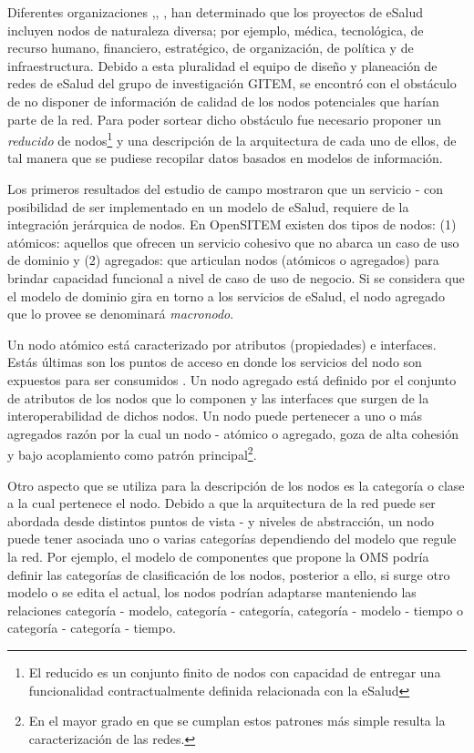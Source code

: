 Diferentes organizaciones \cite{ops2011},\cite{oms2016}, \cite{ituoms2012}, han determinado que los proyectos de eSalud incluyen nodos de naturaleza diversa; por ejemplo, médica, tecnológica, de recurso humano, financiero, estratégico, de organización, de política y de infraestructura. Debido a esta pluralidad el equipo de diseño y planeación de redes de eSalud del grupo de investigación GITEM, se encontró con el obstáculo de no disponer de información de calidad de los nodos potenciales que harían parte de la red. Para poder sortear dicho obstáculo fue necesario proponer un \textit{reducido} de nodos\footnote{El reducido es un conjunto finito de nodos con capacidad de entregar una funcionalidad contractualmente definida relacionada con la eSalud} y una descripción de la arquitectura de cada uno de ellos, de tal manera que se pudiese recopilar datos basados en modelos de información.

Los primeros resultados del estudio de campo mostraron que un servicio - con posibilidad de ser implementado en un modelo de eSalud, requiere de la integración jerárquica de nodos. En OpenSITEM existen dos tipos de nodos: (1) atómicos: aquellos que ofrecen un servicio cohesivo que no abarca un caso de uso de dominio  y (2) agregados: que articulan nodos (atómicos o agregados) para brindar capacidad funcional a nivel de caso de uso de negocio. Si se considera que el modelo de dominio gira en torno a los servicios de eSalud, el nodo agregado que lo provee se denominará \textit{macronodo}.

Un nodo atómico está caracterizado por atributos (propiedades) e interfaces. Estás últimas son los puntos de acceso en donde los servicios del nodo son expuestos para ser consumidos \cite{theopengroup2016}. Un nodo agregado está definido por el conjunto de atributos de los nodos que lo componen y las interfaces que surgen de la interoperabilidad de dichos nodos. Un nodo puede pertenecer a uno o más agregados razón por la cual un nodo - atómico o agregado, goza de alta cohesión y bajo acoplamiento como patrón principal\footnote{En el mayor grado en que se cumplan estos patrones más simple resulta la caracterización de las redes.}.

Otro aspecto que se utiliza para la descripción de los nodos es la categoría o clase a la cual pertenece el nodo. Debido a que la arquitectura de la red puede ser abordada desde distintos puntos de vista - y niveles de abstracción, un nodo puede tener asociada uno o varias categorías dependiendo del modelo que regule la red. Por ejemplo, el modelo de componentes que propone la OMS podría definir las categorías de clasificación de los nodos, posterior a ello, si surge otro modelo o se edita el actual, los nodos podrían adaptarse manteniendo las relaciones categoría - modelo,  categoría - categoría, categoría - modelo - tiempo o categoría - categoría - tiempo.

